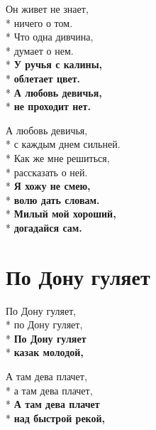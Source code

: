 \medskip

\begin{minipage}{\linewidth}
Он живет не знает,\\*
ничего о том.\\*
Что одна дивчина,\\*
думает о нем.\\*
\textbf{У ручья с калины,}\\*
\textbf{облетает цвет.}\\*
\textbf{А любовь девичья,}\\*
\textbf{не проходит нет.}\\
\end{minipage}\par\medskip\nobreak

\medskip

\begin{minipage}{\linewidth}
А любовь девичья,\\*
с каждым днем сильней.\\*
Как же мне решиться,\\*
рассказать о ней.\\*
\textbf{Я хожу не смею,}\\*
\textbf{волю дать словам.}\\*
\textbf{Милый мой хороший,}\\*
\textbf{догадайся сам.}\\
\end{minipage}

\vspace{\fill}\newpage

\section{По Дону гуляет}
\label{song:По_Дону_гуляет}

\medskip

\begin{minipage}{\linewidth}
По Дону гуляет,\\*
по Дону гуляет,\\*
\textbf{По Дону гуляет}\\*
\textbf{казак молодой,}\\
\end{minipage}\par\medskip\nobreak

\medskip

\begin{minipage}{\linewidth}
А там дева плачет,\\*
а там дева плачет,\\*
\textbf{А там дева плачет}\\*
\textbf{над быстрой рекой,}\\
\end{minipage}\par\medskip\nobreak

